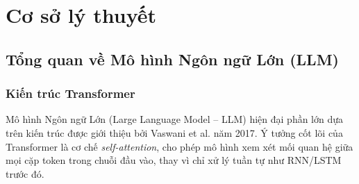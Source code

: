 \documentclass{nt521report}
\begin{document}
\chapter{Cơ sở lý thuyết}
\label{chap:background}

\section{Tổng quan về Mô hình Ngôn ngữ Lớn (LLM)}
\label{sec:llm-overview}

\subsection{Kiến trúc Transformer}

Mô hình Ngôn ngữ Lớn (Large Language Model -- LLM) hiện đại phần lớn dựa trên kiến trúc  được giới thiệu bởi Vaswani et al. \cite{vaswani2017attention} năm 2017. Ý tưởng cốt lõi của Transformer là cơ chế \textit{self-attention}, cho phép mô hình xem xét mối quan hệ giữa mọi cặp token trong chuỗi đầu vào, thay vì chỉ xử lý tuần tự như RNN/LSTM trước đó.
\end{document}
